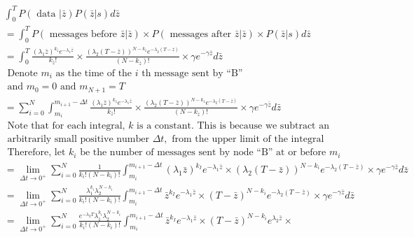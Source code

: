 \documentclass{article}
\begin{document}
\begin{align}
&\int_0^T P( \text{  data } | \bar{z}) P(\bar{z} | s) d\bar{z}  \nonumber \\
&=\int_0^T P( \text{  messages before  } \bar{z} | \bar{z}) \times 
P( \text{  messages after  } \bar{z} | \bar{z})\times  P(\bar{z} | s)d\bar{z} \\
&=\int_0^T   \frac{(\lambda_1\bar{z})^{k_{\bar{z}}}e^{-\lambda_1\bar{z}}}{k_{\bar{z}}!} \times 
                  \frac{(\lambda_2(T- \bar{z}))^{N-k_{\bar{z}}}e^{-\lambda_2(T-\bar{z})}}{(N-k_{\bar{z}})!} \times
                  \gamma e^{-\gamma\bar{z}}d\bar{z} \\
& \text{  Denote } m_i \text{  as the time of the } i \text{ th message sent by ``B''}\\
& \text{  and } m_0 =0 \text{  and } m_{N+1} = T \\
& = \sum_{i=0}^N \int_{m_i}^{m_{i+1}-\Delta t}\frac{(\lambda_1\bar{z})^{k_{\bar{z}}}e^{-\lambda_1\bar{z}}}{k_{\bar{z}}!} \times 
                  \frac{(\lambda_2(T- \bar{z}))^{N-k_{\bar{z}}}e^{-\lambda_2(T-\bar{z})}}{(N-k_{\bar{z}})!} \times
                  \gamma e^{-\gamma\bar{z}}d\bar{z} \\
& \text{ Note that for each integral, $k$ is a constant.  This is because we subtract an} \nonumber \\
& \text{ arbitrarily small positive number } \Delta t, \text{  from the upper limit of the integral} \nonumber \\
& \text{ Therefore, let } k_i \text{  be the number of messages sent by node ``B'' at or before } m_i \nonumber\\ 
& = \lim_{\Delta t \to 0^+}  \sum_{i=0}^N \frac{1}{k_i!(N-k_i)!}
                  \int_{m_i}^{m_{i+1}-\Delta t}(\lambda_1\bar{z})^{k_I}e^{-\lambda_1\bar{z}} \times 
                  (\lambda_2(T- \bar{z}))^{N-k_i}e^{-\lambda_2(T-\bar{z})} \times
                  \gamma e^{-\gamma\bar{z}} d\bar{z} \nonumber\\
& = \lim_{\Delta t \to 0^+}  \sum_{i=0}^N \frac{\lambda_1^{k_i}\lambda_2^{N-k_i}}{k_i!(N-k_i)!}
                  \int_{m_i}^{m_{i+1}-\Delta t}\bar{z}^{k_I}e^{-\lambda_1\bar{z}} \times 
                  (T- \bar{z})^{N-k_i}e^{-\lambda_2(T-\bar{z})} \times
                  \gamma e^{-\gamma\bar{z}} d\bar{z} \nonumber\\
& = \lim_{\Delta t \to 0^+}  \sum_{i=0}^N \frac{e^{-\lambda_2 T}\lambda_1^{k_i}\lambda_2^{N-k_i}}{k_i!(N-k_i)!}
                  \int_{m_i}^{m_{i+1}-\Delta t}  \bar{z}^{k_I}e^{-\lambda_1\bar{z}} \times 
                  (T- \bar{z})^{N-k_i}e^{\lambda_2\bar{z}} \times

\end{align}
\end{document}
